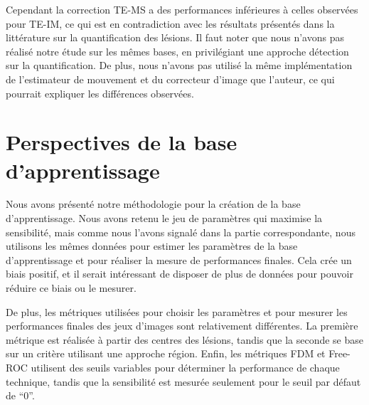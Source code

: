Cependant la correction TE-MS a des performances inférieures à celles observées pour TE-IM, ce qui est en contradiction avec les résultats présentés dans la littérature sur la quantification des lésions. Il faut noter que nous n'avons pas réalisé notre étude sur les mêmes bases, en privilégiant une approche détection sur la quantification. De plus, nous n'avons pas utilisé la même implémentation de l'estimateur de mouvement et du correcteur d'image que l'auteur, ce qui pourrait expliquer les différences observées.

% 
% 
% 

\section{Perspectives de la base d'apprentissage}

Nous avons présenté notre méthodologie pour la création de la base d'apprentissage. Nous avons retenu le jeu de paramètres qui maximise la sensibilité, mais comme nous l'avons signalé dans la partie correspondante, nous utilisons les mêmes données pour estimer les paramètres de la base d'apprentissage et pour réaliser la mesure de performances finales. Cela crée un biais positif, et il serait intéressant de disposer de plus de données pour pouvoir réduire ce biais ou le mesurer.

De plus, les métriques utilisées pour choisir les paramètres et pour mesurer les performances finales des jeux d'images sont relativement différentes. La première métrique est réalisée à partir des centres des lésions, tandis que la seconde se base sur un critère utilisant une approche région. Enfin, les métriques FDM et Free-ROC utilisent des seuils variables pour déterminer la performance de chaque technique, tandis que la sensibilité est mesurée seulement pour le seuil par défaut de ``0''.

